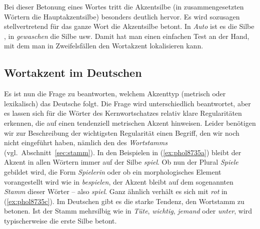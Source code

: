 \begin{exe}
  \ex\label{ex:fokus-deutlich}
  \begin{xlist}
  \end{xlist}
\end{exe}

Bei dieser Betonung eines Wortes tritt die Akzentsilbe (in zusammengesetzten Wörtern die Hauptakzentsilbe) besonders deutlich hervor.
Es wird sozusagen stellvertretend für das ganze Wort die Akzentsilbe betont.
In \textit{Auto} ist es die Silbe \textipa{[\t{aO}]}, in \textit{gewaschen} die Silbe \textipa{[vaS]} usw.
Damit hat man einen einfachen Test an der Hand, mit dem man in Zweifelsfällen den Wortakzent lokalisieren kann.

\subsection{Wortakzent im Deutschen}

\label{sec:wortakzentimdeutschen}

Es ist nun die Frage zu beantworten, welchem Akzenttyp (metrisch oder lexikalisch) das Deutsche folgt.
Die Frage wird unterschiedlich beantwortet, aber es lassen sich für die Wörter des Kernwortschatzes relativ klare Regularitäten erkennen, die auf einen tendenziell metrischen Akzent hinweisen.
Leider benötigen wir zur Beschreibung der wichtigsten Regularität einen Begriff, den wir noch nicht eingeführt haben, nämlich den des \label{abs:3453457}\textit{Wortstamms} (vgl.\ Abschnitt~\ref{sec:stamm}).
In den Beispielen in (\ref{ex:phol8735a}) bleibt der Akzent in allen Wörtern immer auf der Silbe \textit{spiel}.
Ob nun der Plural \textit{Spiele} gebildet wird, die Form \textit{Spielerin} oder ob ein morphologisches Element vorangestellt wird wie in \textit{bespielen}, der Akzent bleibt auf dem sogenannten \textit{Stamm} dieser Wörter -- also \textit{spiel}.
Ganz ähnlich verhält es sich mit \textit{rot} in (\ref{ex:phol8735c}).
Im Deutschen gibt es die starke Tendenz, den Wortstamm zu betonen.
Ist der Stamm mehrsilbig wie in \textit{Tüte}, \textit{wichtig}, \textit{jemand} oder \textit{unter}, wird typischerweise die erste Silbe betont.



